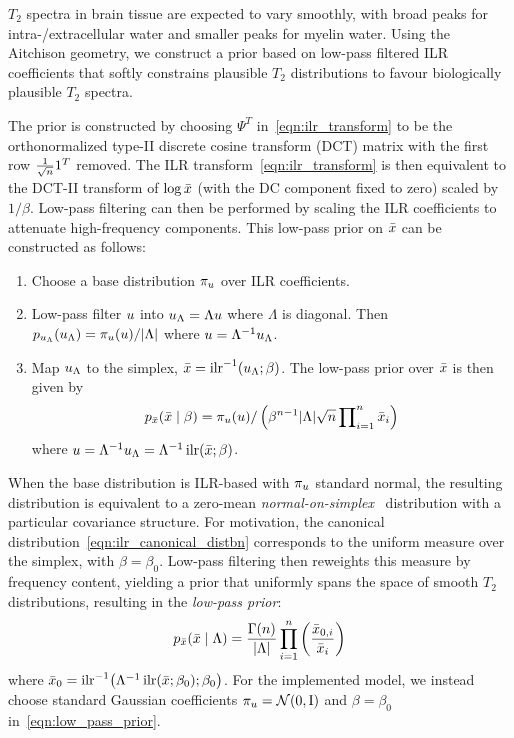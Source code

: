 $T_2$ spectra in brain tissue are expected to vary smoothly, with broad peaks for intra-/extracellular water and smaller peaks for myelin water.
Using the Aitchison geometry, we construct a prior based on low-pass filtered \gls*{ILR} coefficients that softly constrains plausible $T_2$ distributions to favour biologically plausible $T_2$ spectra.

The prior is constructed by choosing $\Psi^T$ in~\eqref{eqn:ilr_transform} to be the orthonormalized type-II discrete cosine transform (\gls*{DCT}) matrix with the first row $\frac{1}{\sqrt{n}} \mathrm{1}^T$ removed.
The \gls*{ILR} transform~\eqref{eqn:ilr_transform} is then equivalent to the \gls*{DCT}-II transform of $\log \bar{x}$ (with the DC component fixed to zero) scaled by $1/\beta$.
Low-pass filtering can then be performed by scaling the \gls*{ILR} coefficients to attenuate high-frequency components.
This low-pass prior on $\bar{x}$ can be constructed as follows:
\begin{enumerate}
    \item Choose a base distribution $\pi_{u}$ over \gls*{ILR} coefficients.
    \item Low-pass filter $u$ into $u_{\Lambda} = \Lambda u$ where $\Lambda$ is diagonal. Then $p_{u_{\Lambda}}(u_{\Lambda}) = \pi_{u}(u) / |\Lambda|$ where $u = \Lambda^{-1} u_{\Lambda}$.
    \item Map $u_{\Lambda}$ to the simplex, $\bar{\distbn} = \InvILR{\vv{u}_{\Lambda}; \beta}$. The low-pass prior over $\bar{x}$ is then given by
          \begin{align}\label{eqn:low_pass_prior}
              p_{\bar{x}}(\bar{x} \mid \beta) = \pi_{u}(u) / \left( \beta^{n-1} |\Lambda| \sqrt{n} \prod\nolimits_{i=1}^{n} \bar{x}_{i} \right)
          \end{align}
          where $\vv{u} = \Lambda^{-1} \vv{u}_{\Lambda} = \Lambda^{-1} \ILR{\bar{\distbn}; \beta}$.
\end{enumerate}
When the base distribution is \gls*{ILR}-based with $\pi_{u}$ standard normal, the resulting distribution is equivalent to a zero-mean \textit{normal-on-simplex}~\citep{figueras_distributions_2003} distribution with a particular covariance structure.
For motivation, the canonical distribution~\eqref{eqn:ilr_canonical_distbn} corresponds to the uniform measure over the simplex, with $\beta = \beta_{0}$.
Low-pass filtering then reweights this measure by frequency content, yielding a prior that uniformly spans the space of smooth $T_2$ distributions, resulting in the \textit{low-pass prior}:
\begin{align}\label{eqn:shallow_lowpass_prior}
    p_{\bar{x}}(\bar{x} \mid \Lambda) = \frac{\Gamma(n)}{|\Lambda|} \prod_{i=1}^{n} \left( \frac{\bar{x}_{0,i}}{\bar{x}_{i}} \right)
\end{align}
where $\bar{\distbn}_{0} = \InvILR{\Lambda^{-1} \ILR{\bar{\distbn}; \beta_{0}}; \beta_{0}}$.
For the implemented model, we instead choose standard Gaussian coefficients $\pi_{u} = \mathcal{N}(\mathrm{0}, \mathrm{I})$ and $\beta = \beta_0$ in~\eqref{eqn:low_pass_prior}.

